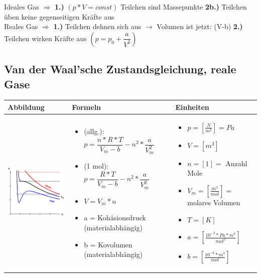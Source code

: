 	 Ideales Gas $\Rightarrow$  \textbf{1.)} $(p*V=const)$            Teilchen sind Massepunkte \textbf{2b.)} Teilchen üben keine gegenseitigen Kräfte aus\\ 
	 Reales Gas $\Rightarrow$ \textbf{1.)}  Teilchen dehnen sich aus $\rightarrow$ Volumen ist jetzt: (V-b) \textbf{2.)} Teilchen wirken Kräfte aus $(p=p_{0}+\dfrac{a}{V^{2}})$\\
	 
	 \newpage
	

\subsection{Van der Waal'sche Zustandsgleichung, reale Gase}				%
\begin{table}[h!]
	\begin{tabular}{ | m{6cm} | m{6cm} | m{6cm} | }
		\hline
		Abbildung & Formeln & Einheiten \\ \hline
		\midrule
		\begin{minipage}{.3\textwidth}
			\includegraphics[width=6.0cm]{Figures/vanderwaal}
		\end{minipage}
		&
		\begin{itemize}
			\item(allg.): $p=\dfrac{n*R*T}{V_{m}-b}-n^{2}*\dfrac{a}{V_{m}^{2}}$ 
			\item(1 mol): $p=\dfrac{R*T}{V_{m}-b}-n^{2}*\dfrac{a}{V_{m}^{2}}$
			\item $V=V_{m}*n$
			\item a = Kohäsionsdruck (materialabhängig)
			\item b = Kovolumen (materialabhängig)
		\end{itemize}
		& 
		\begin{itemize}
			\item $p= [\frac{N}{m^{2}}]=Pa$
			\item $V=[m^3]$
			\item $n=[1]=$ Anzahl Mole
			\item $V_{m}=[\frac{m^3}{mol}]=$ molares Volumen
			\item $T=[K]$
			\item $a=[\frac{10^{-3}*Pa*m^{6}}{mol^{2}}]$
			\item $b=[\frac{10^{-6}*m^{3}}{mol}]$
			

\end{itemize}
\end{tabular}
\end{table}
